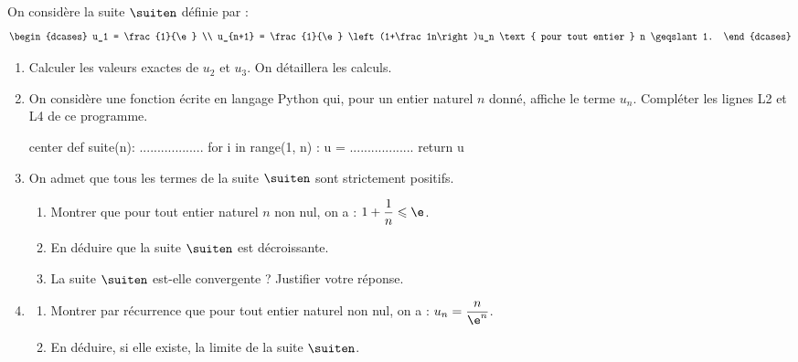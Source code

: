 On considère la suite $\suiten$ définie par : \[ \begin{dcases} u_1 = \frac{1}{\e} \\ u_{n+1} = \frac{1}{\e} \left(1+\frac1n\right)u_n \text{ pour tout entier } n \geqslant 1. \end{dcases} \]

\begin{enumerate}
	\item Calculer les valeurs exactes de $u_2$ et $u_3$. On détaillera les calculs.
	\item On considère une fonction écrite en langage \textsf{Python} qui, pour un entier naturel $n$ donné, affiche le terme $u_n$. Compléter les lignes \textsf{L2} et \textsf{L4} de ce programme.

\begin{CodePythonLstAlt}[Largeur=8cm]{center}
def suite(n):
	..................
	for i in range(1, n) :
		u = ..................
	return u
\end{CodePythonLstAlt}
	\item On admet que tous les termes de la suite $\suiten$ sont strictement positifs.
	\begin{enumerate}
		\item Montrer que pour tout entier naturel $n$ non nul, on a : $1+\dfrac1n \leqslant \e$.
		\item En déduire que la suite $\suiten$ est décroissante.
		\item La suite $\suiten$ est-elle convergente ? Justifier votre réponse.
	\end{enumerate}
	\item 
	\begin{enumerate}
		\item Montrer par récurrence que pour tout entier naturel non nul, on a : $u_n = \dfrac{n}{\e^n}$.
		\item En déduire, si elle existe, la limite de la suite $\suiten$.
	\end{enumerate}
\end{enumerate}

